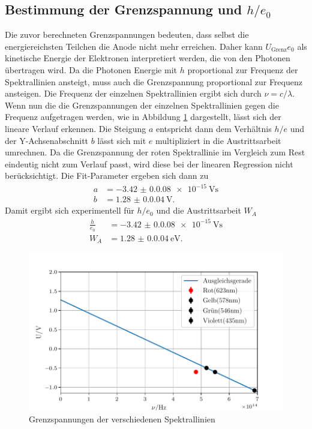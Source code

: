 \subsection{Bestimmung der Grenzspannung und $h/e_0$}
Die zuvor berechneten Grenzspannungen bedeuten, dass selbst die energiereichsten Teilchen
die Anode nicht mehr erreichen. Daher kann $U_\text{Grenz} e_0$ als kinetische Energie der Elektronen 
interpretiert werden, die von den Photonen übertragen wird. Da die Photonen Energie mit $h$ proportional
zur Frequenz der Spektrallinien ansteigt, muss auch die Grenzspannung proportional zur Frequenz ansteigen.
Die Frequenz der einzelnen Spektrallinien ergibt sich durch $\nu=c/\lambda$.
Wenn nun die die Grenzspannungen der einzelnen Spektrallinien gegen die Frequenz aufgetragen werden, wie in Abbildung \ref{fig:Grenz}
dargestellt, lässt sich der lineare Verlauf erkennen. Die Steigung $a$ entspricht dann dem Verhältnis $h/e$ und der
Y-Achsenabschnitt $b$ lässt sich mit $e$ multipliziert in die Austrittsarbeit umrechnen.
Da die Grenzspannung der roten Spektrallinie im Vergleich zum Rest eindeutig nicht zum Verlauf passt, wird diese bei der linearen Regression nicht
berücksichtigt.
Die Fit-Parameter ergeben sich dann zu
\begin{align*}
  a&=\qty{-3.42(0.008)e-15}{\volt\second}\\
  b&=\qty{1.28(0.004)}{\volt}.
\end{align*}
Damit ergibt sich experimentell für $h/e_0$ und die Austrittsarbeit $W_A$
\begin{align}
  \frac{h}{e_0}&=\qty{-3.42(0.008)e-15}{\volt\second}\\
  W_A&=\qty{1.28(0.004)}{\eV}.
  \label{eq:ergebnis}
\end{align}
\begin{figure}[H]
  \centering
  \includegraphics{content/Grenzspannung.pdf}
  \caption{Grenzspannungen der verschiedenen Spektrallinien}
  \label{fig:Grenz}
\end{figure}